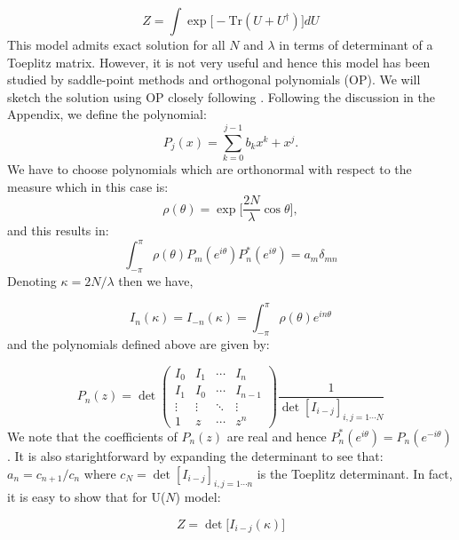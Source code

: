 \documentclass[11pt]{article}
\begin{document}
\begin{equation}
	Z = \int \exp \Big[- \mbox{Tr} (U + U^{\dagger})   \Big] dU
\end{equation}
This model admits exact solution for all $N$ and $\lambda$ in terms of determinant of a Toeplitz matrix. However, it is not very useful and hence this model has been studied by saddle-point methods and orthogonal polynomials (OP). We will sketch the solution using OP 
closely following \cite{Goldschmidt:1979hq}. 
Following the discussion in the Appendix, we define the polynomial:
\begin{equation}
	P_{j}(x) = \sum_{k=0}^{j-1} b_{k} x^{k} + x^{j}. 
\end{equation} 
We have to choose polynomials which are orthonormal with respect to the measure which in this case is:
\begin{equation}
	\rho(\theta) = \exp\Big[\frac{2N}{\lambda} \cos \theta \Big],
\end{equation}
and this results in:
\begin{equation}
	\int_{-\pi}^{\pi} \rho(\theta) P_{m}(e^{i\theta}) P_{n}^{*}(e^{i\theta}) = a_{m} \delta_{mn}
\end{equation}
Denoting $\kappa = 2N/\lambda$ then we have, 

\begin{equation}
	I_{n}(\kappa) = I_{-n}(\kappa) = \int_{-\pi}^{\pi} \rho(\theta) e^{i n \theta} 
\end{equation}
and the polynomials defined above are given by:

\begin{equation}
	P_{n}(z) = \det
	\begin{pmatrix}
		I_0 & I_1 & \cdots & I_n \\
		I_1 & I_0 & \cdots & I_{n-1} \\
		\vdots  & \vdots  & \ddots & \vdots  \\
		1 & z & \cdots & z^n 
			\end{pmatrix}
		 \frac{1}{\det [I_{i-j}]_{i,j = 1 \cdots N}}
\end{equation}
We note that the coefficients of $P_{n}(z)$ are real and hence $P_{n}^{*}(e^{i\theta}) = P_{n}(e^{-i\theta})$. It is also starightforward by expanding the determinant to see that: $a_{n} = c_{n+1}/c_{n}$ where $c_{N} = \det [I_{i-j}]_{i,j = 1 \cdots n}$ is the Toeplitz determinant. In fact, it is easy to show that for U($N$) model:

\begin{equation}
\label{eq:GWW_ex} 
Z = \det \Big[I_{i-j}(\kappa) \Big]
\end{equation}
\end{document}
